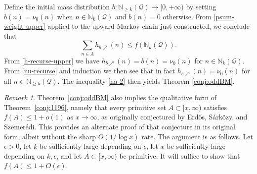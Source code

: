 \documentclass[12pt]{amsart}
\theoremstyle{definition}
\theoremstyle{remark}
\newtheorem{remark}[theorem]{Remark}
\numberwithin{equation}{section}
\newcommand{\N}{{\mathbb N}}
\newcommand{\1}{{\mathbf 1}}
\newcommand{\eps}{{\epsilon}}
\newcommand{\Erdos}{{Erd\H{o}s}}
\newcommand{\Sarkozy}{S\'{a}rk\"{o}zy} %
\newcommand{\Szemeredi}{Szemer\'edi}
\begin{document}
Define the initial mass distribution $b \colon \N_{\ge k}({\mathcal Q}) \to [0,+\infty)$ by setting $b(n) = \nu_0(n)$ when $n \in \N_k({\mathcal Q})$ and $b(n)=0$ otherwise.  From \eqref{psum-weight-upper} applied to the upward Markov chain just constructed, we conclude that
\begin{equation}\label{na-2}
 \sum_{n \in A} h_{b\nearrow}(n) \leq f( \N_{k}({\mathcal Q}) ).
\end{equation}
From \eqref{h-recurse-upper} we have $h_{b\nearrow}(n) = b(n) = \nu_0(n)$ for $n \in \N_k({\mathcal Q})$.  From \eqref{nu-recurse} and induction we then see that in fact $h_{b\nearrow}(n) = \nu_0(n)$ for all $n \in \N_{\geq k}({\mathcal Q})$.  The inequality \eqref{na-2} then yields Theorem \ref{conj:oddBM}.

\begin{remark}\label{remark:qualitative-1196}
Theorem~\ref{conj:oddBM} also implies the qualitative form of Theorem~\ref{conj:1196}, namely that every primitive set $A \subset [x,\infty)$ satisfies $f(A) \leq 1+o(1)$ as $x \to \infty$, as originally conjectured by \Erdos{}, \Sarkozy{}, and \Szemeredi{}.  This provides an alternate proof of that conjecture in its original form, albeit without the sharp $O(1/\log x)$ rate. The argument is as follows. Let $\eps>0$, let $k$ be sufficiently large depending on $\eps$, let $x$ be sufficiently large depending on $k,\eps$, and let $A \subset [x,\infty)$ be primitive. It will suffice to show that $f(A) \leq 1 + O(\eps)$.


\end{remark}
\end{document}
